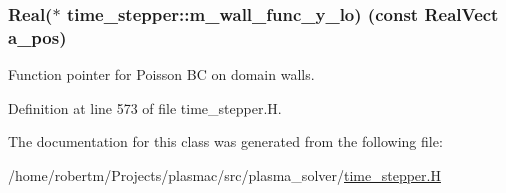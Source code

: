\subsubsection[{\texorpdfstring{m\+\_\+wall\+\_\+func\+\_\+y\+\_\+lo}{m_wall_func_y_lo}}]{\setlength{\rightskip}{0pt plus 5cm}Real($\ast$ time\+\_\+stepper\+::m\+\_\+wall\+\_\+func\+\_\+y\+\_\+lo) (const Real\+Vect a\+\_\+pos)\hspace{0.3cm}{\ttfamily [protected]}}\hypertarget{classtime__stepper_a18f009db00a27df1b1a0acfbf61df35f}{}\label{classtime__stepper_a18f009db00a27df1b1a0acfbf61df35f}


Function pointer for Poisson BC on domain walls. 



Definition at line 573 of file time\+\_\+stepper.\+H.



The documentation for this class was generated from the following file\+:\begin{DoxyCompactItemize}
\item 
/home/robertm/\+Projects/plasmac/src/plasma\+\_\+solver/\hyperlink{time__stepper_8H}{time\+\_\+stepper.\+H}\end{DoxyCompactItemize}
